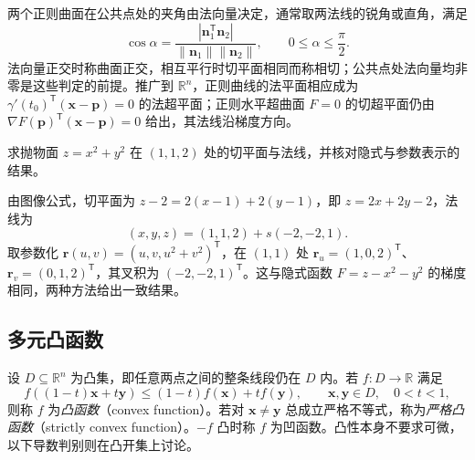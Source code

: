 \documentclass[UTF8,12pt,a4paper,fontset=fandol]{ctexbook}
\begin{document}
两个正则曲面在公共点处的夹角由法向量决定，通常取两法线的锐角或直角，满足
\[
    \cos\alpha=\frac{|\boldsymbol n_1^{\mathsf T}\boldsymbol n_2|}
       {\|\boldsymbol n_1\|\|\boldsymbol n_2\|},\qquad 0\leq\alpha\leq\frac\pi2.
\]
法向量正交时称曲面正交，相互平行时切平面相同而称相切；公共点处法向量均非零是这些判定的前提。推广到 $\mathbb R^n$，正则曲线的法平面相应成为 $\gamma'(t_0)^{\mathsf T}(\boldsymbol x-\boldsymbol p)=0$ 的法超平面；正则水平超曲面 $F=0$ 的切超平面仍由 $\nabla F(\boldsymbol p)^{\mathsf T}(\boldsymbol x-\boldsymbol p)=0$ 给出，其法线沿梯度方向。

\begin{example}
\label{ex:graph-and-parametric-surface-tangent-ch14}
求抛物面 $z=x^2+y^2$ 在 $(1,1,2)$ 处的切平面与法线，并核对隐式与参数表示的结果。
\end{example}
\begin{solve}
由图像公式，切平面为 $z-2=2(x-1)+2(y-1)$，即 $z=2x+2y-2$，法线为
\[
    (x,y,z)=(1,1,2)+s(-2,-2,1).
\]
取参数化 $\boldsymbol r(u,v)=(u,v,u^2+v^2)^{\mathsf T}$，在 $(1,1)$ 处 $\boldsymbol r_u=(1,0,2)^{\mathsf T}$、$\boldsymbol r_v=(0,1,2)^{\mathsf T}$，其叉积为 $(-2,-2,1)^{\mathsf T}$。这与隐式函数 $F=z-x^2-y^2$ 的梯度相同，两种方法给出一致结果。
\end{solve}

\subsection{多元凸函数}
\label{subsec:multivariable-convex-functions}

\begin{definition}
\label{def:multivariable-convex-function-ch14}
设 $D\subseteq\mathbb R^n$ 为凸集，即任意两点之间的整条线段仍在 $D$ 内。若 $f:D\to\mathbb R$ 满足
\[
    f((1-t)\boldsymbol x+t\boldsymbol y)
       \leq(1-t)f(\boldsymbol x)+tf(\boldsymbol y),\qquad
    \boldsymbol x,\boldsymbol y\in D,\quad 0<t<1,
\]
则称 $f$ 为\emph{凸函数}（convex function）。若对 $\boldsymbol x\ne\boldsymbol y$ 总成立严格不等式，称为\emph{严格凸函数}（strictly convex function）。$-f$ 凸时称 $f$ 为凹函数。凸性本身不要求可微，以下导数判别则在凸开集上讨论。
\end{definition}
\end{document}
